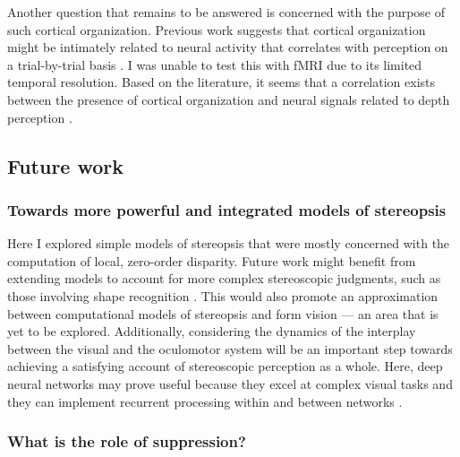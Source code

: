 Another question that remains to be answered is concerned with the purpose of such cortical organization. Previous work suggests that cortical organization might be intimately related to neural activity that correlates with perception on a trial-by-trial basis \cite{Nienborg:2014fu}. I was unable to test this with fMRI due to its limited temporal resolution. Based on the literature, it seems that a correlation exists between the presence of cortical organization and neural signals related to depth perception \cite{Clery:2015lh,Nienborg:2014fu,Nienborg:2007ly,Nienborg:2006qo,Shiozaki:2012ys,Uka:2004mg,DeAngelis:1998df}.


\subsection{Future work}

\subsubsection*{Towards more powerful and integrated models of stereopsis}

Here I explored simple models of stereopsis that were mostly concerned with the computation of local, zero-order disparity. Future work might benefit from extending models to account for more complex stereoscopic judgments, such as those involving shape recognition \cite{Verhoef:2015cz,Verhoef:2012dg,Verhoef:2010gb,Orban:2006kn,Janssen:1999nx}. This would also promote an approximation between computational models of stereopsis and form vision --- an area that is yet to be explored. Additionally, considering the dynamics of the interplay between the visual and the oculomotor system will be an important step towards achieving a satisfying account of stereoscopic perception as a whole. Here, deep neural networks may prove useful because they excel at complex visual tasks and they can implement recurrent processing within and between networks \cite{LeCun:2015ez}.

\subsubsection*{What is the role of suppression?}

